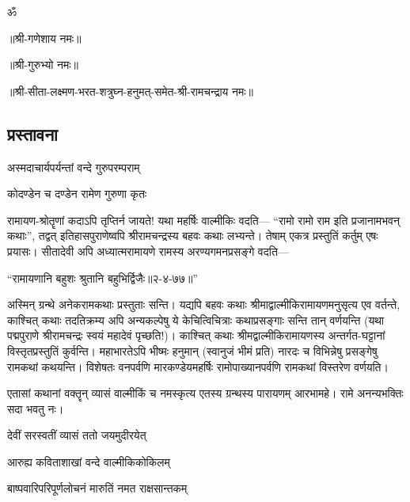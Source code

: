 
\begingroup
{}
\fontsize{12pt}{14.4pt}\selectfont
\centerline{\large{ॐ}}
\centerline{॥श्री-गणेशाय नमः॥}
\centerline{॥श्री-गुरुभ्यो नमः॥}
\centerline{॥श्री-सीता-लक्ष्मण-भरत-शत्रुघ्न-हनुमत्-समेत-श्री-रामचन्द्राय नमः॥}

\thispagestyle{empty}

\begin{center}
\chapter*{{प्रस्तावना}}
\end{center}

{अस्मदाचार्यपर्यन्तां वन्दे गुरुपरम्पराम्}

{कोदण्डेन च दण्डेन रामेण गुरुणा कृतः}

रामायण-श्रोतॄणां कदाऽपि तृप्तिर्न जायते! यथा महर्षिः वाल्मीकिः वदति--- ``रामो रामो राम इति प्रजानामभवन् कथाः'', तद्वत् इतिहासपुराणेष्वपि श्रीरामचन्द्रस्य बहवः कथाः लभ्यन्ते। तेषाम् एकत्र प्रस्तुतिं कर्तुम् एषः प्रयासः। सीतादेवी अपि अध्यात्मरामायणे रामस्य अरण्यगमनप्रसङ्गे वदति---

\centerline{``रामायणानि बहुशः श्रुतानि बहुभिर्द्विजैः॥२-४-७७॥''} 

अस्मिन् ग्रन्थे अनेकरामकथाः प्रस्तुताः सन्ति। यद्यपि बहवः कथाः श्रीमाद्वाल्मीकिरामायण\-मनुसृत्य एव वर्तन्ते, काश्चित् कथाः तदतिक्रम्य अपि अन्यकल्पेषु ये केचित्विचित्राः कथाप्रसङ्गाः सन्ति तान् वर्णयन्ति (यथा पद्मपुराणे श्रीरामचन्द्रः स्वयं महादेवं पृच्छति!)। काश्चित् कथाः श्रीमद्वाल्मीकि\-रामायणस्य अन्तर्गत-घट्टानां विस्तृतप्रस्तुतिं कुर्वन्ति। महाभारतेऽपि भीष्मः हनुमान् (स्वानुजं भीमं प्रति) नारदः च विभिन्नेषु प्रसङ्गेषु रामकथां कथयन्ति। विशेषतः वनपर्वणि मारकण्डेयमहर्षिः रामोपाख्यानपर्वणि रामकथां विस्तरेण वर्णयति।

एतासां कथानां वक्तॄन् व्यासं वाल्मीकिं च नमस्कृत्य एतस्य ग्रन्थस्य पारायणम् आरभामहे। रामे अनन्यभक्तिः सदा भवतु नः। 

{देवीं सरस्वतीं व्यासं ततो जयमुदीरयेत्}

{आरुह्य कविताशाखां वन्दे वाल्मीकिकोकिलम्}


{बाष्पवारिपरिपूर्णलोचनं मारुतिं नमत राक्षसान्तकम्}


